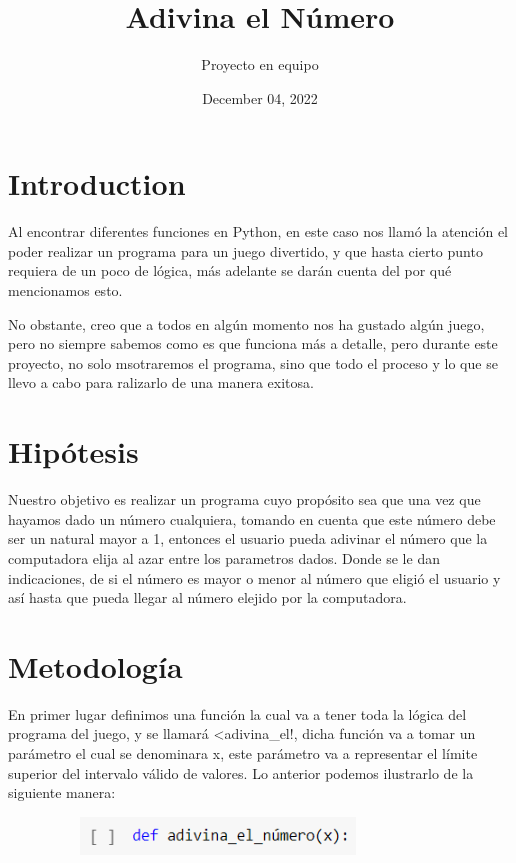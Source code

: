 \documentclass[a4paper,12pt]{article}
\title{Adivina el Número}
\author{Proyecto en equipo }
\date{December 04, 2022}
\begin{document}
\maketitle

\section{Introduction}
\large{Al encontrar diferentes funciones en Python, en este caso nos llamó la atención el poder realizar un programa para un juego divertido, y que hasta cierto punto requiera de un poco de lógica, más adelante se darán cuenta del por qué mencionamos esto.

No obstante, creo que a todos en algún momento nos ha gustado algún juego, pero no siempre sabemos como es que funciona más a detalle, pero durante este proyecto, no solo msotraremos el programa, sino que todo el proceso y lo que se llevo a cabo para ralizarlo de una manera exitosa.}

\section{Hipótesis}
\large{Nuestro objetivo es realizar un programa cuyo propósito sea que una vez que hayamos  dado un número cualquiera, tomando en cuenta que este número debe ser un natural mayor a 1, entonces el  usuario pueda adivinar el número que la computadora elija al azar entre los parametros dados. Donde se le dan indicaciones, de si el número es mayor o menor al número que eligió el usuario y así hasta que pueda llegar al número elejido por la computadora.} 

\section{Metodología}
\large{En primer lugar definimos una función la cual va a tener toda la lógica del programa del juego, y se llamará <adivina\_el!, dicha función va a tomar un parámetro el cual se denominara x, este parámetro va a representar el límite superior del intervalo válido de valores. Lo anterior podemos ilustrarlo de la siguiente manera:}


\begin{figure}[H]
    \caption{}
    \centering \includegraphics[width=9cm, height=1cm]{funjue.png}
    \label{fig1:my_label}
\end{figure}
\end{document}
